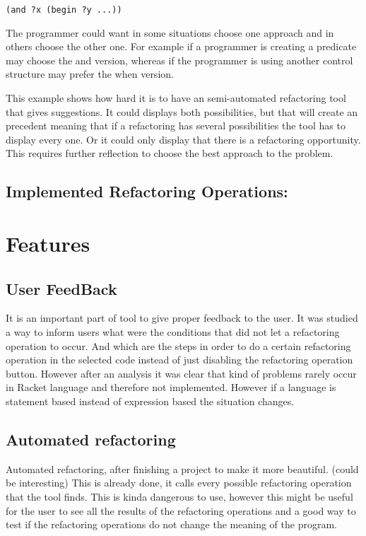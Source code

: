 \begin{lstlisting}[caption="Example"]
(and ?x (begin ?y ...))
\end{lstlisting}

The programmer could want in some situations choose one approach and in others
choose the other one. For example if a programmer is creating a predicate may
choose the and version, whereas if the programmer is using another control structure
may prefer the when version.

This example shows how hard it is to have an semi-automated refactoring tool
that gives suggestions.
It could displays both possibilities, but that will create an precedent meaning
that if a refactoring has several possibilities the tool has to display every one.
Or it could only display that there is a refactoring opportunity.
This requires further reflection to choose the best approach to the problem.


\subsection{Implemented Refactoring Operations:}

\section{Features}

\subsection{User FeedBack}
It is an important part of tool to give proper feedback to the user. It was studied
a way to inform users what were the conditions that did not let a refactoring operation
to occur. And which are the steps in order to do a certain refactoring
operation in the selected code instead of just disabling the refactoring operation
button. However after an analysis it was clear that kind of problems rarely occur
in Racket language and therefore not implemented. However if a language is statement
based instead of expression based the situation changes.

\subsection{Automated refactoring}
Automated refactoring, after finishing a project to make it more beautiful. (could be interesting)
This is already done, it calls every possible refactoring operation that the tool finds.
This is kinda dangerous to use, however this might be useful for the user to see all the results of the refactoring operations
and a good way to test if the refactoring operations do not change the meaning of the program.

